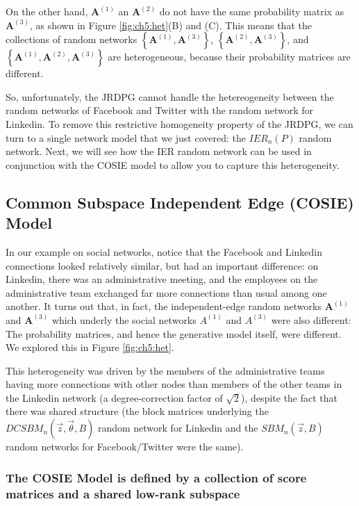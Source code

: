 On the other hand, $\mathbf A^{(1)}$ an $\mathbf A^{(2)}$ do not have the same probability matrix as $\mathbf A^{(3)}$, as shown in Figure \ref{fig:ch5:het}(B) and (C). This means that the collections of random networks $\left\{\mathbf A^{(1)}, \mathbf A^{(3)}\right\}$, $\left\{\mathbf A^{(2)}, \mathbf A^{(3)}\right\}$, and $\left\{\mathbf A^{(1)}, \mathbf A^{(2)}, \mathbf A^{(3)}\right\}$ are {heterogeneous}, because their probability matrices are different. 

So, unfortunately, the JRDPG cannot handle the hetereogeneity between the random networks of Facebook and Twitter with the random network for Linkedin. To remove this restrictive homogeneity property of the JRDPG, we can turn to a single network model that we just covered: the $IER_n(P)$ random network. Next, we will see how the IER random network can be used in conjunction with the COSIE model to allow you to capture this heterogeneity. 

\subsection{Common Subspace Independent Edge (COSIE) Model}
\label{sec:ch5:multi:cosie}

In our example on social networks, notice that the Facebook and Linkedin connections looked relatively similar, but had an important difference: on Linkedin, there was an administrative meeting, and the employees on the administrative team exchanged far more connections than usual among one another. It turns out that, in fact, the independent-edge random networks $\mathbf A^{(1)}$ and $\mathbf A^{(3)}$ which underly the social networks $A^{(1)}$ and $A^{(3)}$ were also different: The probability matrices, and hence the generative model itself, were different. We explored this in Figure \ref{fig:ch5:het}. 

This {heterogeneity} was driven by the members of the administrative teams having more connections with other nodes than members of the other teams in the Linkedin network (a degree-correction factor of $\sqrt 2$), despite the fact that there was shared structure (the block matrices underlying the $DCSBM_n(\vec z, \vec\theta, B)$ random network for Linkedin and the $SBM_n(\vec z, B)$ random networks for Facebook/Twitter were the same).

\subsubsection{The COSIE Model is defined by a collection of score matrices and a shared low-rank subspace}

